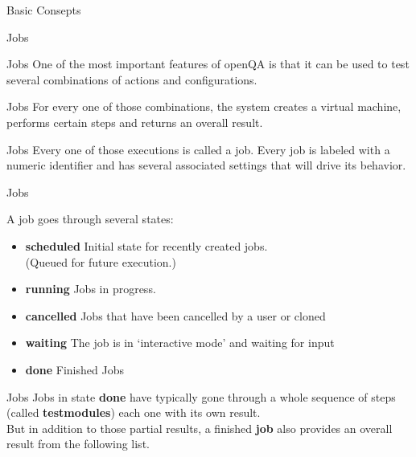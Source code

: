 \documentclass{beamer}
\begin{document}
    \begin{frame}
        \center\huge Basic Consepts
    \end{frame}

    \begin{frame}
        \center\huge Jobs
    \end{frame}

    \begin{frame}{Jobs}
        One of the most important features of openQA is that it can be used to
        test several combinations of actions and configurations.
    \end{frame}

    \begin{frame}{Jobs}
        For every one of those combinations, the system creates a virtual
        machine, performs certain steps and returns an overall result.
    \end{frame}

    \begin{frame}{Jobs}
        Every one of those executions is called a job.
        Every job is labeled with a numeric identifier and has several
        associated settings that will drive its behavior.
    \end{frame}

    \begin{frame}{Jobs}
        \begin{block}{A job goes through several states:}
            \begin{itemize}
                \item {\bf scheduled} Initial state for recently created jobs. \\
                    (Queued for future execution.)
                \item {\bf running} Jobs in progress.
                \item {\bf cancelled} Jobs that have been cancelled by a user or cloned
                \item {\bf waiting} The job is in ‘interactive mode’ and waiting for input
                \item {\bf done} Finished Jobs
            \end{itemize}
        \end{block}
    \end{frame}

    \begin{frame}{Jobs}
        Jobs in state {\bf done} have typically gone through a whole sequence of 
        steps (called {\bf testmodules}) each one with its own result. \\
        But in addition to those partial results, a finished {\bf job} also 
        provides an overall result from the following list.
    \end{frame}
\end{document}
